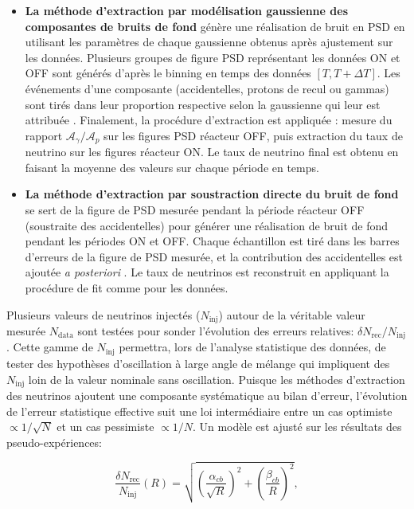 \begin{itemize}[label=\textbullet]
    \item \textbf{La méthode d'extraction par modélisation gaussienne des composantes de bruits de fond} génère une réalisation de bruit en PSD en utilisant les paramètres de chaque gaussienne obtenus après ajustement sur les données. Plusieurs groupes de figure PSD représentant les données ON et OFF sont générés d'après le binning en temps des données $[T, T+\Delta T]$. Les événements d'une composante (accidentelles, protons de recul ou gammas) sont tirés dans leur proportion respective selon la gaussienne qui leur est attribuée \cite{docdb764}. Finalement, la procédure d'extraction est appliquée : mesure du rapport $\mathcal{A}_\gamma/\mathcal{A}_p$ sur les figures PSD réacteur OFF, puis extraction du taux de neutrino sur les figures réacteur ON. Le taux de neutrino final est obtenu en faisant la moyenne des valeurs sur chaque période en temps.
    \item \textbf{La méthode d'extraction par soustraction directe du bruit de fond} se sert de la figure de PSD mesurée pendant la période réacteur OFF (soustraite des accidentelles) pour générer une réalisation de bruit de fond pendant les périodes ON et OFF. Chaque échantillon est tiré dans les barres d'erreurs de la figure de PSD mesurée, et la contribution des accidentelles est ajoutée \textit{a posteriori} \cite{docdb832}. Le taux de neutrinos est reconstruit en appliquant la procédure de fit comme pour les données.
\end{itemize}

\bigbreak

Plusieurs valeurs de neutrinos injectés ($N_\textrm{inj}$) autour de la véritable valeur mesurée $N_\textrm{data}$ sont testées pour sonder l'évolution des erreurs relatives: $\delta N_\textrm{rec} / N_\textrm{inj}$. Cette gamme de $N_\textrm{inj}$ permettra, lors de l'analyse statistique des données, de tester des hypothèses d'oscillation à large angle de mélange qui impliquent des $N_\textrm{inj}$ loin de la valeur nominale sans oscillation. Puisque les méthodes d'extraction des neutrinos ajoutent une composante systématique au bilan d'erreur, l'évolution de l'erreur statistique effective suit une loi intermédiaire entre un cas optimiste $\propto 1/\sqrt{N}$ et un cas pessimiste $\propto 1/N$. Un modèle est ajusté sur les résultats des pseudo-expériences:

\begin{equation}
\label{eq:stat_error}
    \frac{\delta N_\textrm{rec}}{N_\textrm{inj}}\left(R\right) = \sqrt{\left(\frac{\alpha_{cb}}{\sqrt{R}}\right)^2 + \left(\frac{\beta_{cb}}{R}\right)^2},
\end{equation}

